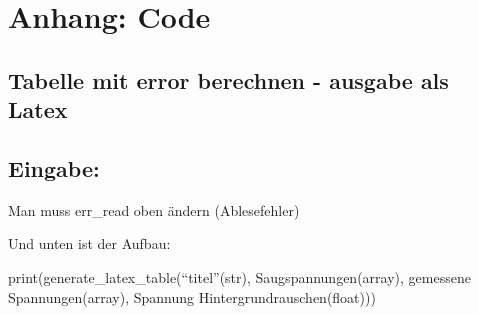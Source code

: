 

\section{Anhang: Code}

    \hypertarget{tabelle-mit-error-berechnen---ausgabe-als-latex}{%
\subsection*{Tabelle mit error berechnen - ausgabe als
Latex}\label{tabelle-mit-error-berechnen---ausgabe-als-latex}}

\hypertarget{eingabe}{%
\subsection*{Eingabe:}\label{eingabe}}

Man muss err\_read oben ändern (Ablesefehler)

Und unten ist der Aufbau:

print(generate\_latex\_table(``titel''(str), Saugspannungen(array),
gemessene Spannungen(array), Spannung Hintergrundrauschen(float)))

